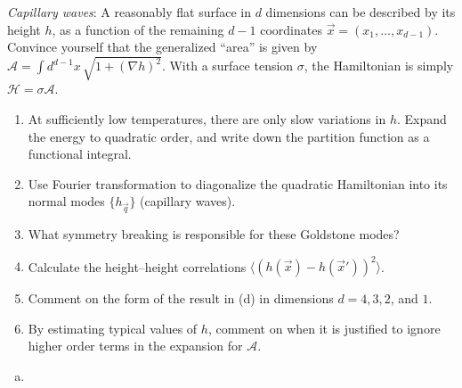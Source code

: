 \begin{problem}
    \textit{Capillary waves}: A reasonably flat surface in $d$ dimensions can be described by its height $h$, as a function of the remaining $d-1$ coordinates $\vec{x} = (x_1, \ldots, x_{d-1})$. Convince yourself that the generalized ``area'' is given by $\mathcal{A} = \int d^{d-1}x\,\sqrt{1 + (\nabla h)^2}$. With a surface tension $\sigma$, the Hamiltonian is simply $\mathcal{H} = \sigma\mathcal{A}$.

    \begin{enumerate}
        \item[(a)] At sufficiently low temperatures, there are only slow variations in $h$. Expand the energy to quadratic order, and write down the partition function as a functional integral.

        \item[(b)] Use Fourier transformation to diagonalize the quadratic Hamiltonian into its normal modes $\{h_{\vec{q}}\}$ (capillary waves).

        \item[(c)] What symmetry breaking is responsible for these Goldstone modes?

        \item[(d)] Calculate the height--height correlations $\langle(h(\vec{x}) - h(\vec{x}'))^2\rangle$.

        \item[(e)] Comment on the form of the result in (d) in dimensions $d = 4, 3, 2$, and $1$.

        \item[(f)] By estimating typical values of $h$, comment on when it is justified to ignore higher order terms in the expansion for $\mathcal{A}$.
    \end{enumerate}
\end{problem}

\begin{solution}
    \begin{enumerate}[(a)]
        \item
    \end{enumerate}
\end{solution}

